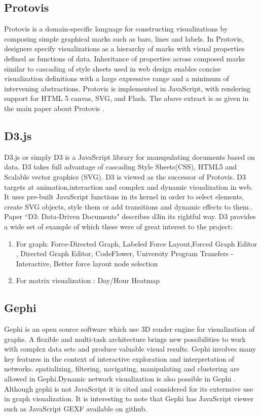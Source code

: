 \subsection{Protovis}
Protovis is a domain-specific
language for constructing visualizations by composing simple
graphical marks such as bars, lines and labels. In Protovis, designers
specify visualizations as a hierarchy of marks with visual properties
defined as functions of data. Inheritance of properties across
composed marks similar to cascading of style sheets used in web
design enables concise visualization definitions with a large expressive
range and a minimum of intervening abstractions. Protovis is implemented
in JavaScript, with rendering support for HTML 5 canvas,
SVG, and Flash. The above extract is as given in the main paper about Protovis
\cite{protovis}.

\subsection{D3.js}
D3.js or simply D3 is a JavaScript library for manupulating documents based on data. D3 takes full advantage of cascading Style Sheets(CSS), HTML5 and Scalable vector graphics (SVG). D3 is viewed as the successor of Protovis. D3 targets at animation,interaction and complex and dynamic visualization in web.  It uses pre-built JavaScript
functions in its kernel in order to select elements, create SVG
objects, style them or add transitions and dynamic effects to
them.\cite{graphjslib}. Paper ``D3: Data-Driven Documents" \cite{d3} describes d3in its rightful way. D3 provides a wide set of example of which these were of great interest to the project:
\begin{enumerate}
\item
For graph: Force-Directed Graph, Labeled Force Layout,Forced Graph Editor , Directed Graph Editor, CodeFlower, University Program Transfers - Interactive, Better force layout node selection
\item For matrix visualization : Day/Hour Heatmap
\end{enumerate}
\subsection{Gephi}

Gephi is an open source software which use 3D render engine for visualization of graphs. 
A flexible and multi-task architecture brings new possibilities
to work with complex data sets and produce
valuable visual results. 
Gephi involves many key features in the context of interactive exploration and
interpretation of networks.  spatializing, filtering,
navigating, manipulating and clustering are allowed in Gephi.Dynamic network visualization is also possible in Gephi \cite{gephi}.
Although gephi is not JavaScript it is cited and considered for its externsive use in graph visualization. It is interesting to note that Gephi has JavaScript viewer such as JavaScript GEXF available on github. 

